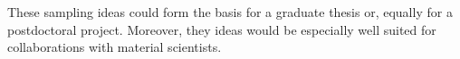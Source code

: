 \documentclass[11pt]{article}
\begin{document}

%

\noindent These sampling ideas could form the basis for a graduate thesis or, equally for a postdoctoral project.  Moreover, they ideas would be especially well suited for collaborations with material scientists.  
%
\end{document}
